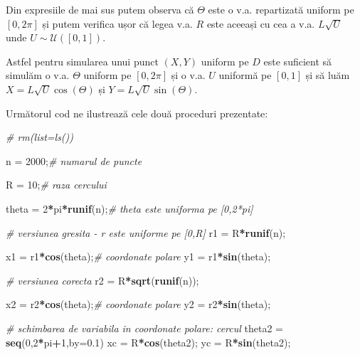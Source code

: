 \documentclass[]{article}
\newenvironment{Shaded}{\begin{snugshade}}{\end{snugshade}}
\newcommand{\KeywordTok}[1]{\textcolor[rgb]{0.13,0.29,0.53}{\textbf{#1}}}
\newcommand{\DataTypeTok}[1]{\textcolor[rgb]{0.13,0.29,0.53}{#1}}
\newcommand{\DecValTok}[1]{\textcolor[rgb]{0.00,0.00,0.81}{#1}}
\newcommand{\FloatTok}[1]{\textcolor[rgb]{0.00,0.00,0.81}{#1}}
\newcommand{\StringTok}[1]{\textcolor[rgb]{0.31,0.60,0.02}{#1}}
\newcommand{\CommentTok}[1]{\textcolor[rgb]{0.56,0.35,0.01}{\textit{#1}}}
\newcommand{\OperatorTok}[1]{\textcolor[rgb]{0.81,0.36,0.00}{\textbf{#1}}}
\newcommand{\NormalTok}[1]{#1}
\begin{document}
Din expresiile de mai sus putem observa că \(\Theta\) este o v.a.
repartizată uniform pe \([0,2\pi]\) și putem verifica ușor că legea v.a.
\(R\) este aceeași cu cea a v.a. \(L\sqrt{U}\) unde
\(U\sim\mathcal{U}([0,1])\).

Astfel pentru simularea unui punct \((X,Y)\) uniform pe \(D\) este
suficient să simulăm o v.a. \(\Theta\) uniform pe \([0,2\pi]\) și o v.a.
\(U\) uniformă pe \([0,1]\) și să luăm \(X=L\sqrt{U}\cos(\Theta)\) și
\(Y=L\sqrt{U}\sin(\Theta)\).

Următorul cod ne ilustrează cele două proceduri prezentate:

\begin{Shaded}
\begin{Highlighting}[]
\CommentTok{# rm(list=ls())}

\NormalTok{n =}\StringTok{ }\DecValTok{2000}\NormalTok{;}\CommentTok{# numarul de puncte}

\NormalTok{R =}\StringTok{ }\DecValTok{10}\NormalTok{;}\CommentTok{# raza cercului }

\NormalTok{theta =}\StringTok{ }\DecValTok{2}\OperatorTok{*}\NormalTok{pi}\OperatorTok{*}\KeywordTok{runif}\NormalTok{(n);}\CommentTok{# theta este uniforma pe [0,2*pi]}

\CommentTok{# versiunea gresita - r este uniforme pe [0,R]}
\NormalTok{r1 =}\StringTok{ }\NormalTok{R}\OperatorTok{*}\KeywordTok{runif}\NormalTok{(n);}

\NormalTok{x1 =}\StringTok{ }\NormalTok{r1}\OperatorTok{*}\KeywordTok{cos}\NormalTok{(theta);}\CommentTok{# coordonate polare}
\NormalTok{y1 =}\StringTok{ }\NormalTok{r1}\OperatorTok{*}\KeywordTok{sin}\NormalTok{(theta);}

\CommentTok{# versiunea corecta}
\NormalTok{r2 =}\StringTok{ }\NormalTok{R}\OperatorTok{*}\KeywordTok{sqrt}\NormalTok{(}\KeywordTok{runif}\NormalTok{(n));}

\NormalTok{x2 =}\StringTok{ }\NormalTok{r2}\OperatorTok{*}\KeywordTok{cos}\NormalTok{(theta);}\CommentTok{# coordonate polare}
\NormalTok{y2 =}\StringTok{ }\NormalTok{r2}\OperatorTok{*}\KeywordTok{sin}\NormalTok{(theta);}

\CommentTok{# schimbarea de variabila in coordonate polare: cercul}
\NormalTok{theta2 =}\StringTok{ }\KeywordTok{seq}\NormalTok{(}\DecValTok{0}\NormalTok{,}\DecValTok{2}\OperatorTok{*}\NormalTok{pi}\OperatorTok{+}\DecValTok{1}\NormalTok{,}\DataTypeTok{by=}\FloatTok{0.1}\NormalTok{) }
\NormalTok{xc =}\StringTok{ }\NormalTok{R}\OperatorTok{*}\KeywordTok{cos}\NormalTok{(theta2);}
\NormalTok{yc =}\StringTok{ }\NormalTok{R}\OperatorTok{*}\KeywordTok{sin}\NormalTok{(theta2);}


\end{Highlighting}
\end{Shaded}
\end{document}
